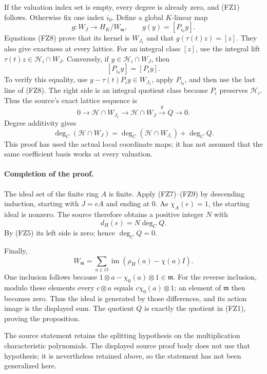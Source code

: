 If the valuation index set is empty, every degree is
already zero, and (FZ1) follows.
Otherwise fix one index \(i_0\).
Define a global \(K\)-linear map
\[
                         g:W_J\longrightarrow H_K/W_{\mathfrak m},
                   \qquad g(y)=[P_{i_0}y].
\]
Equations (FZ8) prove that its kernel is \(W_{J_1}\)
and that \(g(\tau(t)z)=[z]\).
They also give exactness at every lattice.
For an integral class \([z]\), use the integral lift
\(\tau(t)z\in\mathcal H_i\cap W_J\).
Conversely, if \(y\in\mathcal H_i\cap W_J\), then
\[
                              [P_{i_0}y]=[P_i y].
\]
To verify this equality, use
\(y-\tau(t)P_i y\in W_{J_1}\), apply \(P_{i_0}\),
and then use the last line of (FZ8).
The right side is an integral quotient class because
\(P_i\) preserves \(\mathcal H_i\).
Thus the source's exact lattice sequence is
\[
 0\longrightarrow \mathcal H\cap W_{J_1}
  \longrightarrow \mathcal H\cap W_J
  \stackrel g\longrightarrow Q\longrightarrow0.
\]
Degree additivity gives
\[
      \deg_C(\mathcal H\cap W_J)
          =\deg_C(\mathcal H\cap W_{J_1})+\deg_C Q.
 \tag{FZ9}\label{eq:faithful-ideal-degree-step}
\]
This proof has used the actual local coordinate maps;
it has not assumed that the same coefficient basis
works at every valuation.

\paragraph{Completion of the proof.}
The ideal set of the finite ring \(A\) is finite.
Apply (FZ7)--(FZ9) by descending induction, starting
with \(J=eA\) and ending at \(0\).
As \(\chi_A(e)=1\), the starting ideal is nonzero.
The source therefore obtains a positive integer \(N\)
with
\[
                              d_H(e)=N\deg_C Q.
\]
By (FZ5) its left side is zero; hence \(\deg_C Q=0\).

Finally,
\[
 W_{\mathfrak m}
    =\sum_{a\in O}\operatorname{im}
                              (\rho_H(a)-\chi(a)I).
\]
One inclusion follows because
\(1\otimes a-\chi_0(a)\otimes1\in\mathfrak m\).
For the reverse inclusion, modulo these elements every
\(c\otimes a\) equals \(c\chi_0(a)\otimes1\);
an element of \(\mathfrak m\) then becomes zero.
Thus the ideal is generated by those differences,
and its action image is the displayed sum.
The quotient \(Q\) is exactly the quotient in (FZ1),
proving the proposition.

The source statement retains the splitting hypothesis
on the multiplication characteristic polynomials.
The displayed source proof body does not use that
hypothesis; it is nevertheless retained above, so the
statement has not been generalized here.

